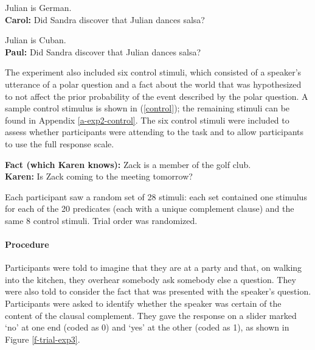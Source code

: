 \documentclass[11pt,fleqn]{article}
\newcommand{\6}{\mbox{$[\hspace*{-.6mm}[$}}
\newcommand{\9}{\mbox{$]\hspace*{-.6mm}]$}}
\begin{document}
\begin{exe}
\ex\label{stim-project} 
\begin{xlist}
 Julian is German.  \\ 
{\bf Carol:} Did Sandra discover that Julian dances salsa?

 Julian is Cuban.  \\ 
{\bf Paul:} Did Sandra discover that Julian dances salsa?
\end{xlist}
\end{exe}

The experiment also included six control stimuli, which consisted of a speaker's utterance of a polar question and a fact about the world that was hypothesized to not affect the prior probability of the event described by the polar question. A sample control stimulus is shown in (\ref{control}); the remaining stimuli can be found in Appendix \ref{a-exp2-control}. The six control stimuli were included to assess whether participants were attending to the task and to allow participants to use the full response scale. 

\begin{exe}
\ex\label{control}
{\bf Fact (which Karen knows):} Zack is a member of the golf club.
\\ {\bf Karen:} Is Zack coming to the meeting tomorrow?
\end{exe}


Each participant saw a random set of 28 stimuli: each set contained one stimulus for each of the 20 predicates (each with a unique complement clause) and the same 8 control stimuli. Trial order was randomized.




\paragraph{Procedure} Participants were told to imagine that they are at a party and that, on walking into the kitchen, they overhear somebody ask somebody else a question. They were also told to consider the fact that was presented with the speaker's question. Participants were asked to identify whether the speaker was certain of the content of the clausal complement. They gave the response on a slider marked `no' at one end (coded as 0) and `yes' at the other (coded as 1), as shown in Figure \ref{f-trial-exp3}.
\end{document}
